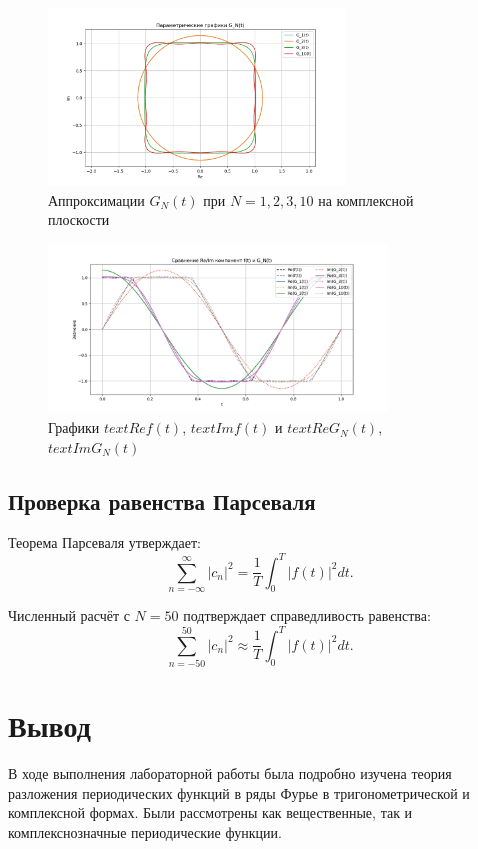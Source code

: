 \begin{figure}[H]
    \centering
    \includegraphics[width=0.7\textwidth]{gn_parametric.png}
    \caption{Аппроксимации $G_N(t)$ при $N=1,2,3,10$ на комплексной плоскости}
\end{figure}

\begin{figure}[H]
    \centering
    \includegraphics[width=0.8\textwidth]{re_im_comparison.png}
    \caption{Графики $text{Re} f(t)$, $text{Im} f(t)$ и $text{Re} G_N(t)$, $text{Im} G_N(t)$}
\end{figure}

\subsection*{Проверка равенства Парсеваля}

Теорема Парсеваля утверждает:
\[
\sum_{n=-\infty}^{\infty} |c_n|^2 = \frac{1}{T} \int_0^T |f(t)|^2 dt.
\]

Численный расчёт с $N = 50$ подтверждает справедливость равенства:
\[
\sum_{n=-50}^{50} |c_n|^2 \approx \frac{1}{T} \int_0^T |f(t)|^2 dt.
\]
\newpage 
\section*{Вывод}

В ходе выполнения лабораторной работы была подробно изучена теория разложения периодических функций в ряды Фурье в тригонометрической и комплексной формах. Были рассмотрены как вещественные, так и комплекснозначные периодические функции.

